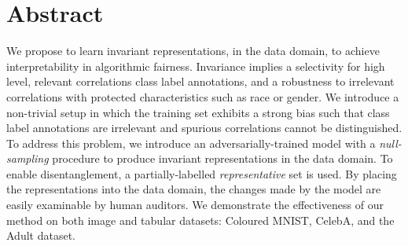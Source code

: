 %
\section*{Abstract}
%
\noindent
%
We propose to learn invariant representations, in the data domain, to achieve interpretability in
algorithmic fairness. 
%
Invariance implies a selectivity for high level, relevant correlations \wrt{} class label
annotations, and a robustness to irrelevant correlations with protected characteristics such as
race or gender. 
%
We introduce a non-trivial setup in which the training set exhibits a strong bias such that class
label annotations are irrelevant and spurious correlations cannot be distinguished. 
%
To address this problem, we introduce an adversarially-trained model with a \emph{null-sampling}
procedure to produce invariant representations in the data domain.
%
To enable disentanglement, a partially-labelled \emph{representative} set is used. 
%
By placing the representations into the data domain, the changes made by the model are easily
examinable by human auditors. 
%
We demonstrate the effectiveness of our method on both image and tabular datasets: Coloured MNIST,
CelebA, and the Adult dataset.
